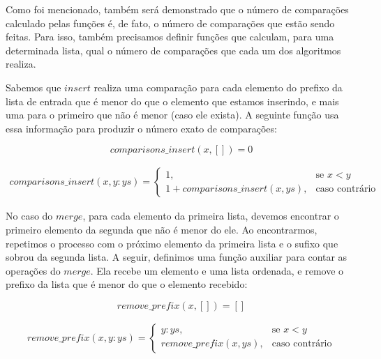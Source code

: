 \documentclass[12pt, oneside, a4paper,english,brazil]{abntex2}
\begin{document}
\qquad Como foi mencionado, tamb\'em ser\'a demonstrado que o n\'umero de compara\c{c}\~oes
calculado pelas fun\c{c}\~oes \'e, de fato, o n\'umero de compara\c{c}\~oes que est\~ao sendo feitas.
Para isso, tamb\'em precisamos definir fun\c{c}\~oes que calculam, para uma determinada lista,
qual o n\'umero de compara\c{c}\~oes que cada um dos algoritmos realiza.

\qquad Sabemos que $insert$ realiza uma compara\c{c}\~ao para cada elemento do prefixo da lista
de entrada que \'e menor do que o elemento que estamos inserindo, e mais uma para o primeiro
que n\~ao \'e menor (caso ele exista). A seguinte fun\c{c}\~ao usa essa informa\c{c}\~ao
para produzir o n\'umero exato de compara\c{c}\~oes:

\begin{equation}
  comparisons\_insert(x, []) = 0
\end{equation}


\begin{equation}
\begin{split}
  comparisons\_insert(x, y : ys) =
    \begin{cases}
      1, &\text{se } x < y \\
      1 + comparisons\_insert(x, ys), &\text{caso contr\'ario}
    \end{cases}
\end{split}
\end{equation}


\qquad No caso do $merge$, para cada elemento da primeira lista, devemos encontrar o primeiro
elemento da segunda que n\~ao \'e menor do ele. Ao encontrarmos, repetimos o processo com o pr\'oximo
elemento da primeira lista e o sufixo que sobrou da segunda lista. A seguir, definimos uma
fun\c{c}\~ao auxiliar para contar as opera\c{c}\~oes do $merge$. Ela
recebe um elemento e uma lista ordenada, e remove o prefixo da lista que \'e menor do que o elemento
recebido:

\begin{equation}
  remove\_prefix(x, []) = []
\end{equation}

\begin{equation}
\begin{split}
  remove\_prefix(x, y : ys) =
    \begin{cases}
      y : ys, &\text{se } x < y \\
      remove\_prefix(x, ys), &\text{caso contr\'ario}
    \end{cases}
\end{split}
\end{equation}
\end{document}
